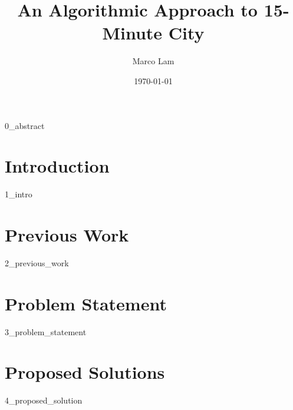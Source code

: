 \documentclass[oneside]{book}
\title{An Algorithmic Approach to 15-Minute City}
\author{Marco Lam}
\date{\today}
\begin{document}
\maketitle

{0_abstract}

\newpage

\tableofcontents
\listoftables
\listofalgorithms
\newpage

\chapter{Introduction}

{1_intro}

\newpage

\chapter{Previous Work} \label{previous_works}

{2_previous_work}

\newpage

\chapter{Problem Statement}

{3_problem_statement}

\newpage

\chapter{Proposed Solutions}

{4_proposed_solution}

\newpage


\end{document}
